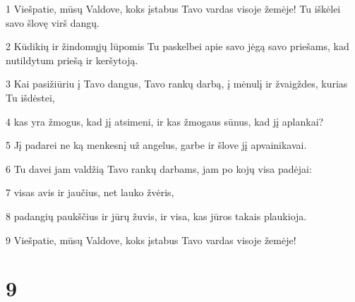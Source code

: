 \par 1 Viešpatie, mūsų Valdove, koks įstabus Tavo vardas visoje žemėje! Tu iškėlei savo šlovę virš dangų. 
\par 2 Kūdikių ir žindomųjų lūpomis Tu paskelbei apie savo jėgą savo priešams, kad nutildytum priešą ir keršytoją. 
\par 3 Kai pasižiūriu į Tavo dangus, Tavo rankų darbą, į mėnulį ir žvaigždes, kurias Tu išdėstei, 
\par 4 kas yra žmogus, kad jį atsimeni, ir kas žmogaus sūnus, kad jį aplankai? 
\par 5 Jį padarei ne ką menkesnį už angelus, garbe ir šlove jį apvainikavai. 
\par 6 Tu davei jam valdžią Tavo rankų darbams, jam po kojų visa padėjai: 
\par 7 visas avis ir jaučius, net lauko žvėris, 
\par 8 padangių paukščius ir jūrų žuvis, ir visa, kas jūros takais plaukioja. 
\par 9 Viešpatie, mūsų Valdove, koks įstabus Tavo vardas visoje žemėje!



\chapter{9}


